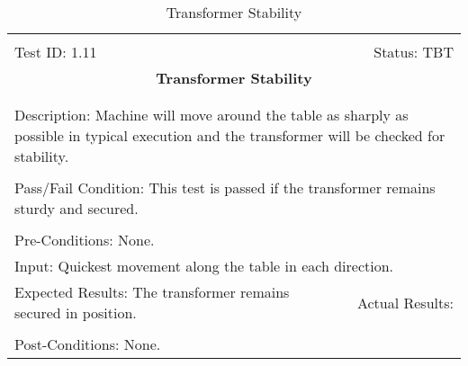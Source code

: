 \documentclass[titlepage]{article}
\begin{document}
\begin{center}%
\begin{table}[h!]
\begin{tabular}{|l r|}\hline&\\[-2mm]
	Test ID: 1.11	&Status: TBT\\[-3mm]
	\multicolumn{2}{|c|}{\textbf{\large{Transformer Stability}}}\\&\\\hline&\\[-3mm]
	\multicolumn{2}{|p{\textwidth}|}{Description: Machine will move around the table as sharply as possible in typical execution and the transformer will be checked for stability.}\\[1mm]\hline&\\[-3mm]
	\multicolumn{2}{|p{\textwidth}|}{Pass/Fail Condition: This test is passed if the transformer remains sturdy and secured.}\\[1mm]\hline&\\[-3mm]
	\multicolumn{2}{|p{\textwidth}|}{Pre-Conditions: None.}\\[4mm]
	\multicolumn{2}{|p{\textwidth}|}{Input: Quickest movement along the table in each direction.}\\[2mm]\hline
	\multicolumn{1}{|p{0.49\textwidth}}{Expected Results: The transformer remains secured in position.}	&\multicolumn{1}{|p{0.45\textwidth}|}{Actual Results:}\\\hline&\\[-3mm]
	\multicolumn{2}{|p{\textwidth}|}{Post-Conditions: None.}\\\hline
\end{tabular}
\caption{Transformer Stability}
\end{table}
\end{center}
\newpage
\end{document}
